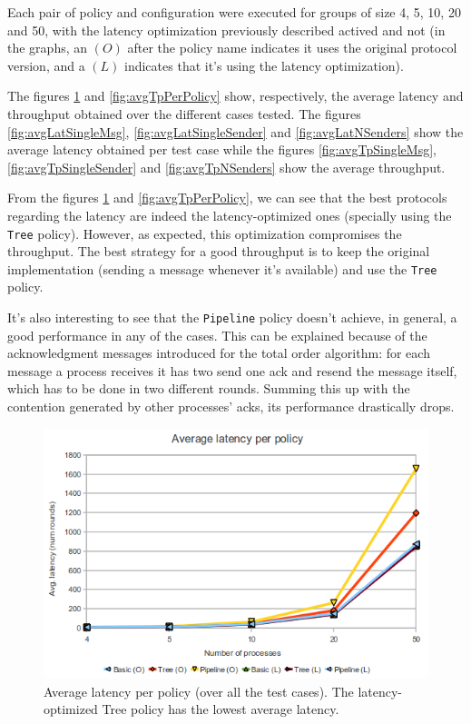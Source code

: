 \documentclass[a4paper, 11pt]{article}
\begin{document}
Each pair of policy and configuration were executed for groups of size 4, 5, 10, 20 and 50, with the latency optimization previously  described actived and not (in the graphs, an $(O)$ after the policy name indicates it uses the original protocol version, and a $(L)$ indicates that it's using the latency optimization).

	The figures \ref{fig:avgLatPerPolicy} and \ref{fig:avgTpPerPolicy} show, respectively, the average latency and throughput obtained over the different cases tested. The figures \ref{fig:avgLatSingleMsg}, \ref{fig:avgLatSingleSender} and \ref{fig:avgLatNSenders} show the average latency obtained per test case while the figures \ref{fig:avgTpSingleMsg}, \ref{fig:avgTpSingleSender} and \ref{fig:avgTpNSenders} show the average throughput.
	
	From the figures \ref{fig:avgLatPerPolicy} and \ref{fig:avgTpPerPolicy}, we can see that the best protocols regarding the latency are indeed the latency-optimized ones (specially using the \texttt{Tree} policy). However, as expected, this optimization compromises the throughput. The best strategy for a good throughput is to keep the original implementation (sending a message whenever it's available) and use the \texttt{Tree} policy.
	
	It's also interesting to see that the \texttt{Pipeline} policy doesn't achieve, in general, a good performance in any of the cases. This can be explained because of the acknowledgment messages introduced for the total order algorithm: for each message a process receives it has two send one ack and resend the message itself, which has to be done in two different rounds. Summing this up with the contention generated by other processes' acks, its performance drastically drops.

\begin{figure}[htp]
  \centering
  \includegraphics[scale=0.6]{avgLatPerPolicy.png}
	\caption{Average latency per policy (over all the test cases). The latency-optimized Tree policy has the lowest average latency.}
  \label{fig:avgLatPerPolicy}
\end{figure}
\end{document}
